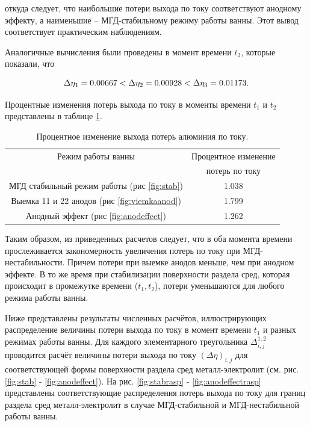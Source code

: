 \documentclass[]{pmi}
\begin{document}
откуда следует, что наибольшие потери выхода по току соответствуют анодному эффекту, а наименьшие – МГД-стабильному режиму работы ванны. Этот вывод соответствует практическим наблюдениям.

Аналогичные вычисления были проведены в момент времени $t_2$, которые показали, что

\begin{equation}
\Delta\eta_1 = 0.00667 < \Delta\eta_2 = 0.00928 < \Delta\eta_3 = 0.01173. \notag
\end{equation}

Процентные изменения потерь выхода по току в моменты времени $t_1$ и $t_2$ представлены в таблице \ref{table:ismineniep}. 

\begin{table}[H]
\centering
\caption{Процентное изменение выхода потерь алюминия по току.}
\begin{tabular}{|c|c|}
\hline
Режим работы ванны & Процентное изменение \\
 					& потерь по току \\
\hline
МГД стабильный режим работы (рис \ref{fig:stab}) & 1.038	\\
\hline
Выемка 11 и 22 анодов (рис \ref{fig:viemkaanod}) &	1.799\\
\hline
Анодный эффект (рис \ref{fig:anodeffect}) & 1.262	\\
\hline
\end{tabular}
\label{table:ismineniep}
\end{table}

Таким образом, из приведенных расчетов следует, что в оба момента времени прослеживается закономерность увеличения потерь по току при МГД-нестабильности. Причем потери при выемке анодов меньше, чем при анодном эффекте. В то же время при стабилизации поверхности раздела сред, которая происходит в промежутке времени ($t_1, t_2$), потери уменьшаются для любого режима работы ванны.

Ниже представлены результаты численных расчётов, иллюстрирующих распределение величины потери выхода по току в момент времени $t_1$ и разных режимах работы ванны. Для каждого элементарного треугольника $\Delta^{1,2}_{i,j}$ проводится расчёт величины потери выхода по току $(\Delta\eta)_{i,j}$ для соответствующей формы поверхности раздела сред металл-электролит (см. рис. \ref{fig:stab} - \ref{fig:anodeffect}). На рис. \ref{fig:stabrasp} - \ref{fig:anodeffectrasp} представлены соответствующие распределения потерь выхода по току для границ раздела сред металл-электролит в случае МГД-стабильной и МГД-нестабильной работы ванны.
\end{document}

